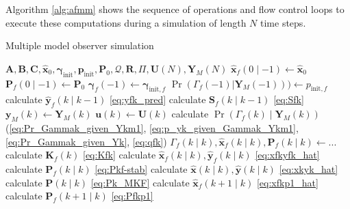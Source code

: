 {{Algorithm \ref{alg:afmm} shows the sequence of operations and flow control loops to execute these computations during a simulation of length $N$ time steps.
%
\begin{algorithm}
	\caption{Multiple model observer simulation}  \label{alg:afmm}
	\begin{algorithmic}
			\Require $\mathbf{A}, \mathbf{B}, \mathbf{C}, \mathbf{\hat{x}}_0, \mathbf{\gamma}_{\text{init}}, \mathbf{p}_{\text{init}}, \mathbf{P}_0, \mathcal{Q}, \mathbf{R}, \Pi, \mathbf{U}(N), \mathbf{Y}_M(N)$
				\State $\mathbf{\hat{x}}_f(0 \mid -1) \gets \mathbf{\hat{x}}_0$
				\State $\mathbf{P}_f(0 \mid -1) \gets \mathbf{P}_0$
				\State $\mathbf{\gamma}_f(-1) \gets \mathbf{\gamma}_{\text{init},f}$
				\State $\Pr(\Gamma_f(-1)|\mathbf{Y}_M(-1))) \gets p_{\text{init},f}$
			\EndFor
				\State calculate $\mathbf{\hat{y}}_f(k \mid k-1)$ \eqref{eq:yfk_pred} 
				\State calculate $\mathbf{S}_f(k \mid k-1)$ \eqref{eq:Sfk}
			\EndFor
			\State $\mathbf{y}_M(k) \gets \mathbf{Y}_M(k)$   %
			\State $\mathbf{u}(k) \gets \mathbf{U}(k)$
				\State calculate $\Pr(\Gamma_f(k) \mid \mathbf{Y}_M(k))$ (\ref{eq:Pr_Gammak_given_Ykm1}, \ref{eq:p_yk_given_Gammak_Ykm1}, \ref{eq:Pr_Gammak_given_Yk}, \ref{eq:qfk})       %
			\EndFor
			\State $\Gamma_f(k \mid k), \mathbf{\hat{x}}_f(k \mid k), \mathbf{P}_f(k \mid k) \gets ...$   %
				\State calculate $\mathbf{K}_f(k)$ \eqref{eq:Kfk} 
				\State calculate $\mathbf{\hat{x}}_f(k \mid k), \mathbf{\hat{y}}_f(k \mid k)$ \eqref{eq:xfkyfk_hat}
				\State calculate $\mathbf{P}_f(k \mid k)$ \eqref{eq:Pkf-stab}
			\EndFor
			\State calculate $\mathbf{\hat{x}}(k \mid k), \mathbf{\hat{y}}(k \mid k)$ \eqref{eq:xkyk_hat} 
			\State calculate $\mathbf{P}(k \mid k)$ \eqref{eq:Pk_MKF}   %
				\State calculate $\mathbf{\hat{x}}_f(k+1 \mid k)$ \eqref{eq:xfkp1_hat} 
				\State calculate $\mathbf{P}_f(k+1 \mid k)$ \eqref{eq:Pfkp1}
			\EndFor
			\EndFor
		\end{algorithmic}
\end{algorithm}

}}
